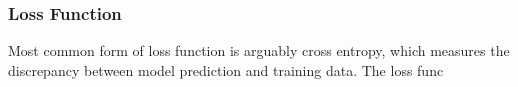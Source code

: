 \subsubsection{Loss Function}

Most common form of loss function is arguably cross entropy, which measures the discrepancy between model prediction and training data. The loss func